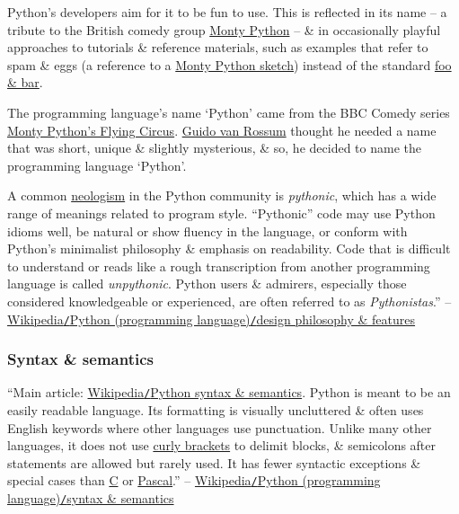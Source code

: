 \documentclass{article}
\numberwithin{equation}{section}
\begin{document}
Python's developers aim for it to be fun to use. This is reflected in its name -- a tribute to the British comedy group \href{https://en.wikipedia.org/wiki/Monty_Python}{Monty Python} -- \& in occasionally playful approaches to tutorials \& reference materials, such as examples that refer to spam \& eggs (a reference to a \href{https://en.wikipedia.org/wiki/Spam_(Monty_Python)}{Monty Python sketch}) instead of the standard \href{https://en.wikipedia.org/wiki/Foobar}{foo \& bar}.

The programming language's name `Python' came from the BBC Comedy series \href{https://en.wikipedia.org/wiki/Monty_Python%27s_Flying_Circus}{Monty Python's Flying Circus}. \href{https://en.wikipedia.org/wiki/Guido_van_Rossum}{Guido van Rossum} thought he needed a name that was short, unique \& slightly mysterious, \& so, he decided to name the programming language `Python'. 

A common \href{https://en.wikipedia.org/wiki/Neologism}{neologism} in the Python community is \textit{pythonic}, which has a wide range of meanings related to program style. ``Pythonic'' code may use Python idioms well, be natural or show fluency in the language, or conform with Python's minimalist philosophy \& emphasis on readability. Code that is difficult to understand or reads like a rough transcription from another programming language is called \textit{unpythonic}. Python users \& admirers, especially those considered knowledgeable or experienced, are often referred to as \textit{Pythonistas}.'' -- \href{https://en.wikipedia.org/wiki/Python_(programming_language)#Design_philosophy_and_features}{Wikipedia\texttt{/}Python (programming language)\texttt{/}design philosophy \& features}

\subsubsection{Syntax \& semantics}
``Main article: \href{https://en.wikipedia.org/wiki/Python_syntax_and_semantics}{Wikipedia\texttt{/}Python syntax \& semantics}. Python is meant to be an easily readable language. Its formatting is visually uncluttered \& often uses English keywords where other languages use punctuation. Unlike many other languages, it does not use \href{https://en.wikipedia.org/wiki/Curly_bracket_programming_language}{curly brackets} to delimit blocks, \& semicolons after statements are allowed but rarely used. It has fewer syntactic exceptions \& special cases than \href{https://en.wikipedia.org/wiki/C_(programming_language)}{C} or \href{https://en.wikipedia.org/wiki/Pascal_(programming_language)}{Pascal}.'' -- \href{https://en.wikipedia.org/wiki/Python_(programming_language)#Syntax_and_semantics}{Wikipedia\texttt{/}Python (programming language)\texttt{/}syntax \& semantics}
\end{document}
